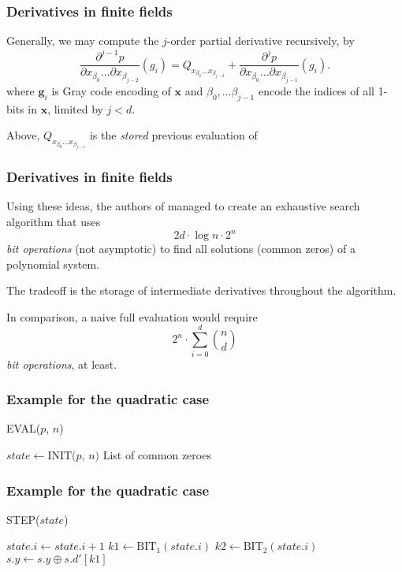\documentclass{beamer}
\begin{document}
\begin{frame}
    \frametitle{Derivatives in finite fields}
    Generally, we may compute the $j$-order partial derivative recursively, by 
    $$
        \frac{\partial^{j - 1} p}{\partial x_{\beta_0} \dots \partial x_{\beta_{j - 2}}}(g_i) = Q_{x_{\beta_0} \dots x_{\beta_{j - 2}}} + \frac{\partial^j p}{\partial x_{\beta_0} \dots \partial x_{\beta_{j - 1}}}(g_i).
    $$
    where $\mathbf{g}_i$ is Gray code encoding of $\mathbf{x}$ and $\beta_0, \dots \beta_{j - 1}$ encode the indices of all 1-bits in $\mathbf{x}$, limited by $j < d$.
    
    Above, $Q_{x_{\beta_0} \dots x_{\beta_{j - 1}}}$ is the \textit{stored} previous evaluation of 
\end{frame}

\begin{frame}
    \frametitle{Derivatives in finite fields}
    Using these ideas, the authors of \cite{ches-2010-23990} managed to create an exhaustive search algorithm that uses 
    $$
        2d \cdot \log n \cdot 2^n
    $$
    \textit{bit operations} (not asymptotic) to find all solutions (common zeros) of a polynomial system. 

    The tradeoff is the storage of intermediate derivatives throughout the algorithm.

    In comparison, a naive full evaluation would require 
    $$
        2^n \cdot \sum_{i = 0}^{d} \binom{n}{d}
    $$
    \textit{bit operations}, at least.
\end{frame}

\begin{frame}
    \frametitle{Example for the quadratic case}
    \begin{algorithm}[H]
        \DontPrintSemicolon
        \SetAlgoLined
        \caption{EVAL($p$, $n$)}\label{alg:fes_eval}
        $state \gets \text{INIT($p$, $n$)}$\;
        \Return List of common zeroes
    \end{algorithm}
\end{frame}

\begin{frame}
    \frametitle{Example for the quadratic case}
    \begin{algorithm}[H]
        \DontPrintSemicolon
        \SetAlgoLined
        \caption{STEP($state$)}\label{alg:fes_step}
        $state.i \gets state.i + 1$\;
        $k1 \gets \text{BIT}_1(state.i)$\;
        $k2 \gets \text{BIT}_2(state.i)$\;
        $s.y \gets s.y \oplus s.d'[k1]$\;
    \end{algorithm}
\end{frame}
\end{document}
